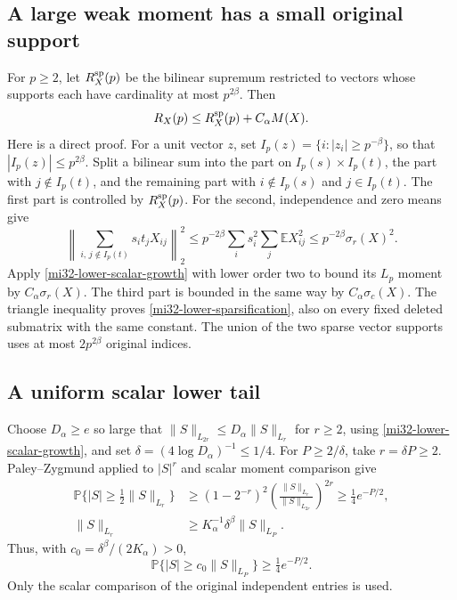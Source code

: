 \documentclass[11pt]{article}
\theoremstyle{definition}
\theoremstyle{remark}
\newcommand{\E}{\mathbb E}
\newcommand{\Prob}{\mathbb P}
\newcommand{\norm}[1]{\lVert#1\rVert}
\begin{document}
\subsection{A large weak moment has a small original support}

For $p\ge2$, let $R_X^{\rm sp}(p)$ be the bilinear supremum
restricted to vectors whose supports each have cardinality at most
$p^{2\beta}$. Then
\begin{equation}\label{mi32-lower-sparsification}
 R_X(p)\le R_X^{\rm sp}(p)+C_\alpha M(X).
\end{equation}
Here is a direct proof. For a unit vector $z$, set
$I_p(z)=\{i:|z_i|\ge p^{-\beta}\}$, so that
$|I_p(z)|\le p^{2\beta}$. Split a bilinear sum into the part on
$I_p(s)\times I_p(t)$, the part with $j\notin I_p(t)$, and the
remaining part with $i\notin I_p(s)$ and $j\in I_p(t)$.
The first part is controlled by $R_X^{\rm sp}(p)$. For the second,
independence and zero means give
\[
 \left\|\sum_{i,\,j\notin I_p(t)}s_it_jX_{ij}\right\|_2^2
 \le p^{-2\beta}\sum_i s_i^2\sum_j\E X_{ij}^2
 \le p^{-2\beta}\sigma_r(X)^2.
\]
Apply \eqref{mi32-lower-scalar-growth} with lower order two
to bound its $L_p$ moment by $C_\alpha\sigma_r(X)$.
The third part is bounded in the same way by
$C_\alpha\sigma_c(X)$. The triangle inequality proves
\eqref{mi32-lower-sparsification}, also on every fixed deleted
submatrix with the same constant. The union of the two sparse
vector supports uses at most $2p^{2\beta}$ original indices.

\subsection{A uniform scalar lower tail}

Choose $D_\alpha\ge e$ so large that
$\norm{S}_{L_{2r}}\le D_\alpha\norm{S}_{L_r}$ for $r\ge2$,
using \eqref{mi32-lower-scalar-growth}, and set
$\delta=(4\log D_\alpha)^{-1}\le1/4$.
For $P\ge2/\delta$, take $r=\delta P\ge2$.
Paley--Zygmund applied to $|S|^r$ and scalar moment comparison give
\[
 \begin{split}
 \Prob\{|S|\ge\tfrac12\norm{S}_{L_r}\}
 &\ge(1-2^{-r})^2
       \left(\frac{\norm{S}_{L_r}}{\norm{S}_{L_{2r}}}\right)^{2r}
       \ge\tfrac14 e^{-P/2},\\
 \norm{S}_{L_r}&\ge K_\alpha^{-1}\delta^\beta\norm{S}_{L_P}.
 \end{split}
\]
Thus, with $c_0=\delta^\beta/(2K_\alpha)>0$,
\begin{equation}\label{mi32-lower-tail}
 \Prob\{|S|\ge c_0\norm{S}_{L_P}\}\ge\tfrac14e^{-P/2}.
\end{equation}
Only the scalar comparison of the original independent entries is used.
\end{document}

